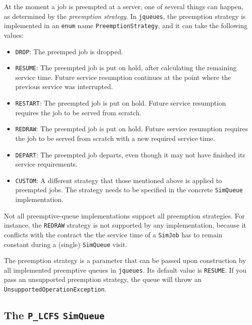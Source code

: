 \documentclass[12pt]{book}
\begin{document}
At the moment a job is preempted at a server, one of several things can happen,
  as determined by the {\em preemption strategy}.
In \lstinline|jqueues|, the preemption strategy is implemented in an \lstinline|enum|
  name \lstinline|PreemptionStrategy|, and it can take the following values:
\begin{itemize}
  \item \lstinline|DROP|: The preemped job is dropped.
  \item \lstinline|RESUME|: The preempted job is put on hold, after calculating the remaining service time.
                            Future service resumption continues at the point where the previous service was interrupted.
  \item \lstinline|RESTART|: The preempted job is put on hold.
                             Future service resumption requires the job to be served from scratch.
  \item \lstinline|REDRAW|: The preempted job is put on hold.
                            Future service resumption requires the job to be served from scratch
                            with a new required service time.
  \item \lstinline|DEPART|: The preempted job departs, even though it may not have finished its service requirements.
  \item \lstinline|CUSTOM|: A different strategy that those mentioned above is applied to preempted jobs.
                            The strategy needs to be specified in the concrete \lstinline|SimQueue| implementation.
\end{itemize}
Not all preemptive-queue implementations support all preemption strategies.
For instance, the \lstinline|REDRAW| strategy is not supported by any implementation,
  because it conflicts with the contract the the service time of a \lstinline|SimJob| has
  to remain constant during a (single) \lstinline|SimQueue| visit.

The preemption strategy is a parameter that can be passed upon construction by all implemented
  preemptive queues in \lstinline|jqueues|.
Its default value is \lstinline|RESUME|.
If you pass an unsupported preemption strategy,
  the queue will throw an \lstinline|UnsupportedOperationException|.

\subsection{The \lstinline{P_LCFS} \lstinline{SimQueue}}
\end{document}
